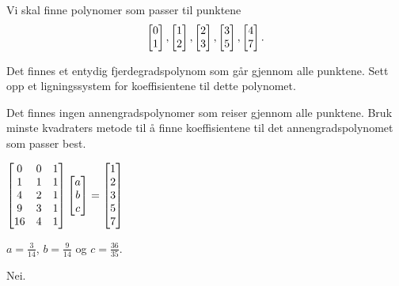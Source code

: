 %

\begin{oppgave}
Vi skal finne polynomer som passer til punktene
$$\begin{bmatrix} 0 \\ 1 \end{bmatrix}, \begin{bmatrix} 1 \\ 2 \end{bmatrix}, \begin{bmatrix} 2 \\ 3 \end{bmatrix},\begin{bmatrix} 3 \\ 5 \end{bmatrix},\begin{bmatrix} 4 \\ 7 \end{bmatrix}.$$

\begin{punkt}
Det finnes et entydig fjerdegradspolynom  som går gjennom alle punktene. Sett opp et ligningssystem for koeffisientene til dette polynomet. 
\end{punkt}

\begin{punkt}
Det finnes ingen annengradspolynomer som reiser gjennom alle punktene. Bruk minste kvadraters metode til å finne koeffisientene til det annengradspolynomet som passer best.
\end{punkt}


\end{oppgave}

\begin{losning}
\begin{punkt}
$
\begin{bmatrix}
0 & 0 & 1\\
1 & 1 & 1\\
4 & 2 & 1\\
9 & 3 & 1\\
16 & 4 & 1
\end{bmatrix}\begin{bmatrix} a \\ b \\ c \end{bmatrix}=\begin{bmatrix}
1\\
2\\
3\\
5\\
7
\end{bmatrix}$
\end{punkt}

\begin{punkt}
$a=\frac{3}{14}$, $b=\frac{9}{14}$ og $c=\frac{36}{35}$.
\end{punkt}

\begin{punkt}
Nei.
\end{punkt}

\end{losning}


